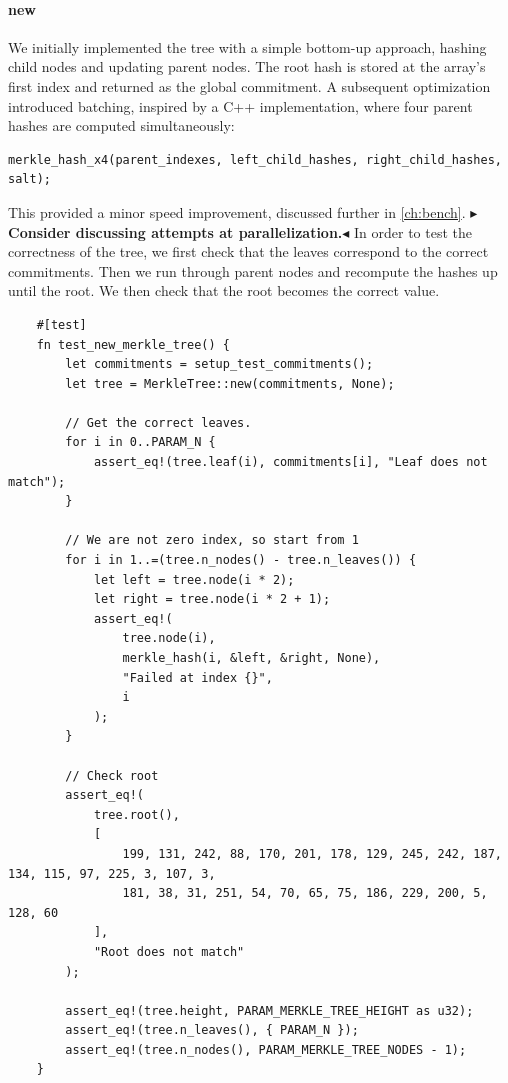 \documentclass[11pt]{report}
\theoremstyle{definition}
\theoremstyle{plain}
\newcommand{\todo}[1]{{\color[rgb]{.5,0,0}\textbf{$\blacktriangleright$#1$\blacktriangleleft$}}}
\begin{document}
\paragraph{new}\label{sec:new}
We initially implemented the tree with a simple bottom-up approach, hashing child nodes and updating parent nodes. The root hash is stored at the array's first index and returned as the global commitment. A subsequent optimization introduced batching, inspired by a C++ implementation, where four parent hashes are computed simultaneously:
\begin{verbatim}
merkle_hash_x4(parent_indexes, left_child_hashes, right_child_hashes, salt);
\end{verbatim}
This provided a minor speed improvement, discussed further in \autoref{ch:bench}. \todo{Consider discussing attempts at parallelization.}
In order to test the correctness of the tree, we first check that the leaves correspond to the correct commitments. Then we run through parent nodes and recompute the hashes up until the root. We then check that the root becomes the correct value.
\begin{verbatim}
    #[test]
    fn test_new_merkle_tree() {
        let commitments = setup_test_commitments();
        let tree = MerkleTree::new(commitments, None);

        // Get the correct leaves.
        for i in 0..PARAM_N {
            assert_eq!(tree.leaf(i), commitments[i], "Leaf does not match");
        }

        // We are not zero index, so start from 1
        for i in 1..=(tree.n_nodes() - tree.n_leaves()) {
            let left = tree.node(i * 2);
            let right = tree.node(i * 2 + 1);
            assert_eq!(
                tree.node(i),
                merkle_hash(i, &left, &right, None),
                "Failed at index {}",
                i
            );
        }

        // Check root
        assert_eq!(
            tree.root(),
            [
                199, 131, 242, 88, 170, 201, 178, 129, 245, 242, 187, 134, 115, 97, 225, 3, 107, 3,
                181, 38, 31, 251, 54, 70, 65, 75, 186, 229, 200, 5, 128, 60
            ],
            "Root does not match"
        );

        assert_eq!(tree.height, PARAM_MERKLE_TREE_HEIGHT as u32);
        assert_eq!(tree.n_leaves(), { PARAM_N });
        assert_eq!(tree.n_nodes(), PARAM_MERKLE_TREE_NODES - 1);
    }
\end{verbatim}
\end{document}
